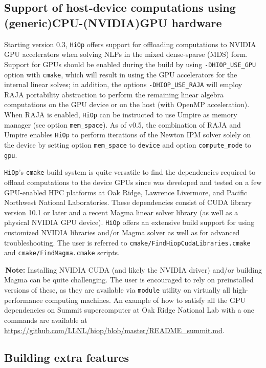 \documentclass[11pt]{article}
\newcounter{line}
\newcommand{\warningSymbol}{\raisebox{0.9\depth}{\danger}}
\newcommand{\warningcp}[1]{%
        \smallskip \noindent \textcolor{warningColorText}{\warningSymbol{}}\,\textbf{#1} %
    }
\newcommand{\Hi}{\texttt{HiOp}\xspace}
\begin{document}
\subsection{Support of host-device computations using (generic)CPU-(NVIDIA)GPU hardware}

Starting version 0.3, \Hi offers support for offloading computations to NVIDIA GPU accelerators when solving NLPs in the mixed dense-sparse (MDS) form. Support for GPUs should be enabled during the build by using \texttt{-DHIOP\_USE\_GPU} option with \texttt{cmake}, which will result in using the GPU accelerators for the internal linear solves; in addition, the options \texttt{-DHIOP\_USE\_RAJA} will employ RAJA portability abstraction to perform the remaining linear algebra computations on the GPU device or on the host (with OpenMP acceleration). When RAJA is enabled, \Hi can be instructed to use Umpire as memory manager (see option \texttt{mem\_space}). As of v0.5, the combination of RAJA and Umpire enables \Hi to perform iterations of the Newton IPM solver solely on the device by setting option \texttt{mem\_space} to \texttt{device} and option \texttt{compute\_mode} to \texttt{gpu}. 

\Hi's \texttt{cmake} build system is quite versatile to find the dependencies required to offload computations to the device GPUs since was developed and tested on a few GPU-enabled HPC platforms at Oak Ridge, Lawrence Livermore, and Pacific Northwest National Laboratories. These dependencies consist of CUDA library version 10.1 or later and a recent Magma linear solver library (as well as a physical NVIDIA GPU device). \Hi offers an extensive build support for using customized NVIDIA libraries and/or Magma solver as well as for advanced troubleshooting. The user is referred to \texttt{cmake/FindHiopCudaLibraries.cmake} and \texttt{cmake/FindMagma.cmake} scripts.

\warningcp{Note: } Installing NVIDIA CUDA (and likely the NVIDIA driver) and/or building Magma can be quite challenging. The user is encouraged to rely on preinstalled versions of these, as they are available via \texttt{module} utility on virtually all high-performance computing machines. An example of how to satisfy all the GPU dependencies on Summit supercomputer at Oak Ridge National Lab with a one commands are available at \url{https://github.com/LLNL/hiop/blob/master/README_summit.md}.

\subsection{Building extra features}
\end{document}
